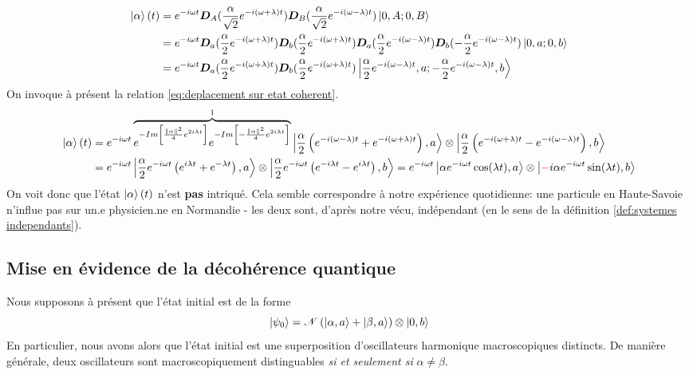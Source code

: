 \documentclass[11pt,oneside,a4paper]{article}
\begin{document}
\begin{align*}
  \ket{\alpha}(t) &= e^{-i\omega t}\bm{D}_A(\frac{\alpha}{\sqrt{2}}e^{-i\left(\omega+\lambda\right)t})\bm{D}_B(\frac{\alpha}{\sqrt{2}}e^{-i\left(\omega-\lambda\right)t})\ket{0,A;0,B}\\
  &= e^{-i\omega t}\bm{D}_a(\frac{\alpha}{2}e^{-i\left(\omega+\lambda\right)t})\bm{D}_b(\frac{\alpha}{2}e^{-i\left(\omega+\lambda\right)t})\bm{D}_a(\frac{\alpha}{2}e^{-i\left(\omega-\lambda\right)t})\bm{D}_b(-\frac{\alpha}{2}e^{-i\left(\omega-\lambda\right)t})\ket{0,a;0,b}\\
  &= e^{-i\omega t}\bm{D}_a(\frac{\alpha}{2}e^{-i\left(\omega+\lambda\right)t})\bm{D}_b(\frac{\alpha}{2}e^{-i\left(\omega+\lambda\right)t})\ket{\frac{\alpha}{2}e^{-i\left(\omega-\lambda\right)t},a;-\frac{\alpha}{2}e^{-i\left(\omega-\lambda\right)t},b}
\end{align*}
On invoque à présent la relation \eqref{eq:deplacement sur etat coherent}.
\begin{align}
  \ket{\alpha}(t) &= e^{-i\omega t}\overbrace{e^{-Im\left[\frac{\norm{\alpha}^2}{4}e^{2i\lambda t}\right]}e^{-Im\left[-\frac{\norm{\alpha}^2}{4}e^{2i\lambda t}\right]}}^1\ket{\frac{\alpha}{2}\left(e^{-i\left(\omega-\lambda\right)t}+e^{-i\left(\omega+\lambda\right)t}\right),a}\otimes\ket{\frac{\alpha}{2}\left(e^{-i\left(\omega+\lambda\right)t}-e^{-i\left(\omega-\lambda\right)t}\right),b}\notag\\
  &= e^{-i\omega t}\ket{\frac{\alpha}{2}e^{-i\omega t}\left(e^{i\lambda t}+e^{-\lambda t}\right),a}\otimes\ket{\frac{\alpha}{2}e^{-i\omega t}\left(e^{-i\lambda t}-e^{i\lambda t}\right),b} = e^{-i\omega t}\ket{\alpha e^{-i\omega t}\cos(\lambda t),a}\otimes\ket{\color{red}-\color{black}i\alpha e^{-i\omega t}\sin(\lambda t),b}\label{eq:etat naif evolue}
\end{align}
On voit donc que l'état $\ket{\alpha}(t)$ n'est \textbf{pas} intriqué. Cela semble correspondre à notre expérience quotidienne: une particule en Haute-Savoie n'influe pas sur un.e physicien.ne en Normandie - les deux sont, d'après notre vécu, indépendant (en le sens de la définition \ref{def:systemes independants}).

\subsection{Mise en évidence de la décohérence quantique}
Nous supposons à présent que l'état initial est de la forme
\begin{equation}
  \ket{\psi_0} = \mathcal{N}\left(\ket{\alpha,a}+\ket{\beta,a}\right)\otimes\ket{0,b}\label{eq:quantum decoherence initial state}
\end{equation}
En particulier, nous avons alors que l'état initial est une superposition d'oscillateurs harmonique macroscopiques distincts. De manière générale, deux oscillateurs sont macroscopiquement distinguables \emph{si et seulement si} $\alpha\neq\beta$.
\end{document}
